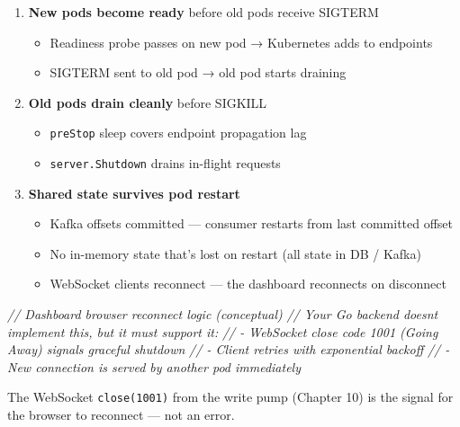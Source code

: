 \documentclass[
]{article}
\newenvironment{Shaded}{}{}
\newcommand{\CommentTok}[1]{\textcolor[rgb]{0.38,0.63,0.69}{\textit{#1}}}
\providecommand{\tightlist}{%
  \setlength{\itemsep}{0pt}\setlength{\parskip}{0pt}}
\begin{document}
\begin{enumerate}
\def\labelenumi{\arabic{enumi}.}
\tightlist
\item
  \textbf{New pods become ready} before old pods receive SIGTERM

  \begin{itemize}
  \tightlist
  \item
    Readiness probe passes on new pod → Kubernetes adds to endpoints
  \item
    SIGTERM sent to old pod → old pod starts draining
  \end{itemize}
\item
  \textbf{Old pods drain cleanly} before SIGKILL

  \begin{itemize}
  \tightlist
  \item
    \texttt{preStop} sleep covers endpoint propagation lag
  \item
    \texttt{server.Shutdown} drains in-flight requests
  \end{itemize}
\item
  \textbf{Shared state survives pod restart}

  \begin{itemize}
  \tightlist
  \item
    Kafka offsets committed --- consumer restarts from last committed
    offset
  \item
    No in-memory state that's lost on restart (all state in DB / Kafka)
  \item
    WebSocket clients reconnect --- the dashboard reconnects on
    disconnect
  \end{itemize}
\end{enumerate}

\begin{Shaded}
\begin{Highlighting}[]
\CommentTok{// Dashboard browser reconnect logic (conceptual)}
\CommentTok{// Your Go backend doesn\textquotesingle{}t implement this, but it must support it:}
\CommentTok{// {-} WebSocket close code 1001 (Going Away) signals graceful shutdown}
\CommentTok{// {-} Client retries with exponential backoff}
\CommentTok{// {-} New connection is served by another pod immediately}
\end{Highlighting}
\end{Shaded}

The WebSocket \texttt{close(1001)} from the write pump (Chapter 10) is
the signal for the browser to reconnect --- not an error.
\end{document}
